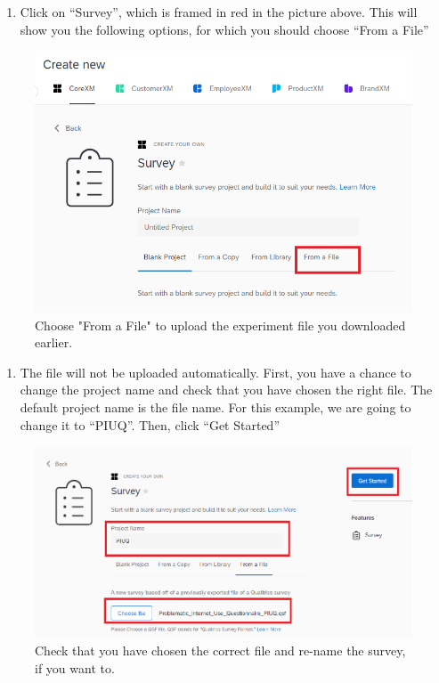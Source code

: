\documentclass[
]{book}
\providecommand{\tightlist}{%
  \setlength{\itemsep}{0pt}\setlength{\parskip}{0pt}}
\begin{document}
\begin{enumerate}
\def\labelenumi{\arabic{enumi}.}
\setcounter{enumi}{3}
\tightlist
\item
  Click on ``Survey'', which is framed in red in the picture above. This will show you the following options, for which you should choose ``From a File''
\end{enumerate}

\begin{figure}

{\centering \includegraphics[width=0.85\linewidth]{images/Qualtrics/04FromFile} 

}

\caption{Choose "From a File" to upload the experiment file you downloaded earlier.}\label{fig:Figure11-4}
\end{figure}

\begin{enumerate}
\def\labelenumi{\arabic{enumi}.}
\setcounter{enumi}{4}
\tightlist
\item
  The file will not be uploaded automatically. First, you have a chance to change the project name and check that you have chosen the right file. The default project name is the file name. For this example, we are going to change it to ``PIUQ''. Then, click ``Get Started''
\end{enumerate}

\begin{figure}

{\centering \includegraphics[width=0.85\linewidth]{images/Qualtrics/05FromFile2} 

}

\caption{Check that you have chosen the correct file and re-name the survey, if you want to.}\label{fig:Figure11-5}
\end{figure}
\end{document}
